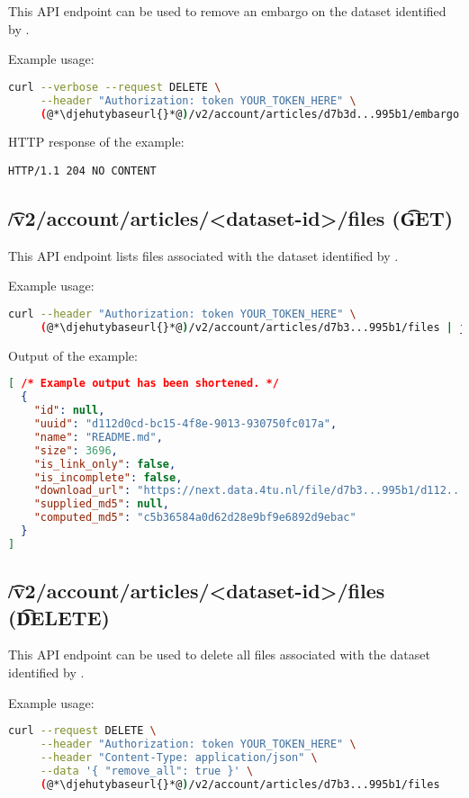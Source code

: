   This API endpoint can be used to remove an embargo on the dataset
  identified by .

  Example usage:
\begin{lstlisting}[language=bash]
curl --verbose --request DELETE \
     --header "Authorization: token YOUR_TOKEN_HERE" \
     (@*\djehutybaseurl{}*@)/v2/account/articles/d7b3d...995b1/embargo
\end{lstlisting}

  HTTP response of the example:
\begin{lstlisting}
HTTP/1.1 204 NO CONTENT
\end{lstlisting}

\subsection{\t{/v2/account/articles/<dataset-id>/files} (\t{GET})}

  This API endpoint lists files associated with the dataset identified by
  .

  Example usage:
\begin{lstlisting}[language=bash]
curl --header "Authorization: token YOUR_TOKEN_HERE" \
     (@*\djehutybaseurl{}*@)/v2/account/articles/d7b3...995b1/files | jq
\end{lstlisting}

  Output of the example:
\begin{lstlisting}[language=JSON]
[ /* Example output has been shortened. */
  {
    "id": null,
    "uuid": "d112d0cd-bc15-4f8e-9013-930750fc017a",
    "name": "README.md",
    "size": 3696,
    "is_link_only": false,
    "is_incomplete": false,
    "download_url": "https://next.data.4tu.nl/file/d7b3...995b1/d112...c017a",
    "supplied_md5": null,
    "computed_md5": "c5b36584a0d62d28e9bf9e6892d9ebac"
  }
]
\end{lstlisting}

\subsection{\t{/v2/account/articles/<dataset-id>/files} (\t{DELETE})}


  This API endpoint can be used to delete all files associated with the
  dataset identified by .

  Example usage:
\begin{lstlisting}[language=bash]
curl --request DELETE \
     --header "Authorization: token YOUR_TOKEN_HERE" \
     --header "Content-Type: application/json" \
     --data '{ "remove_all": true }' \
     (@*\djehutybaseurl{}*@)/v2/account/articles/d7b3...995b1/files
\end{lstlisting}

